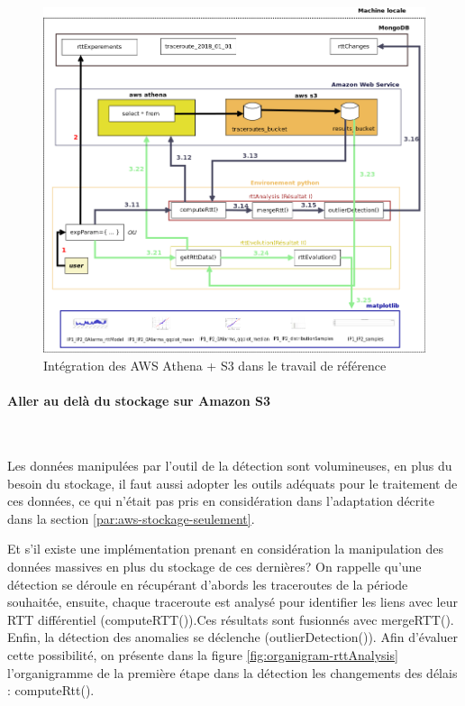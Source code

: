 \begin{figure}[H]
\centering
\includegraphics[width=1\linewidth]{illustrations/travail-de-reference-avec-athena}
\caption{Intégration des AWS  Athena + S3 dans le travail de référence}
\label{fig:travail-de-reference-avec-athena}
\end{figure}

\paragraph{Aller au delà du stockage sur Amazon S3}~

Les données manipulées par l'outil de la détection sont volumineuses, en plus du besoin du stockage, il faut aussi adopter les outils adéquats pour le traitement de ces données, ce qui n'était pas pris en considération dans l'adaptation décrite dans la section \ref{par:aws-stockage-seulement}.  

Et s'il existe une implémentation prenant en considération la manipulation des données massives en plus du stockage de ces dernières? On rappelle qu'une détection se déroule en récupérant d'abords les traceroutes de la période souhaitée, ensuite, chaque traceroute est analysé pour identifier les liens avec leur RTT différentiel (computeRTT()).Ces résultats sont fusionnés avec mergeRTT(). Enfin, la détection des anomalies se déclenche (outlierDetection()). Afin d'évaluer cette possibilité, on présente dans la figure \ref{fig:organigram-rttAnalysis} l'organigramme de la première étape dans la détection les changements des délais : computeRtt(). 

